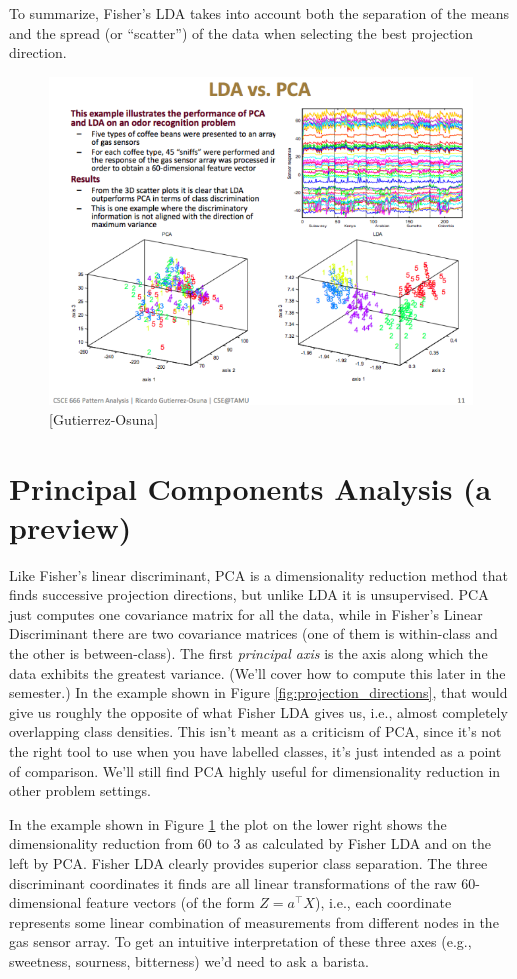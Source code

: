 \documentclass[a4paper]{article}
\begin{document}
To summarize, Fisher's LDA takes into account both the separation of the means and the spread (or ``scatter'') of the data when selecting the best projection direction.

\begin{figure}
\centering
\includegraphics[width=1.0\textwidth]{coffee_beans_LDA.png}
\caption{\label{fig:coffee_beans_LDA} [Gutierrez-Osuna]}
\end{figure}

\section{Principal Components Analysis (a preview)}
Like Fisher's linear discriminant, PCA is a dimensionality reduction method that finds successive projection directions, but unlike LDA it is unsupervised.  PCA just computes one covariance matrix for all the data, while in Fisher's Linear Discriminant there are two covariance matrices (one of them is within-class and the other is between-class). The first \emph{principal axis} is the axis along which the data exhibits the greatest variance. (We'll cover how to compute this later in the semester.) In the example shown in Figure \ref{fig:projection_directions}, that would give us roughly the opposite of what Fisher LDA gives us, i.e., almost completely overlapping class densities.  This isn't meant as a criticism of PCA, since it's not the right tool to use when you have labelled classes, it's just intended as a point of comparison.  We'll still find PCA highly useful for dimensionality reduction in other problem settings.

In the example shown in Figure \ref{fig:coffee_beans_LDA} the plot on the lower right shows the dimensionality reduction from 60 to 3 as calculated by Fisher LDA and on the left by PCA. Fisher LDA clearly provides superior class separation.  The three discriminant coordinates it finds are all linear transformations of the raw 60-dimensional feature vectors (of the form $Z=a^\top X$), i.e., each coordinate represents some linear combination of measurements from different nodes in the gas sensor array. To get an intuitive interpretation of these three axes (e.g., sweetness, sourness, bitterness) we'd need to ask a barista.
\end{document}
